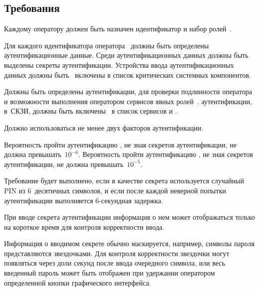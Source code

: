 \subsection{Требования}\label{IA.Reqs}

\label{R.IA.Id}
Каждому оператору должен быть назначен идентификатор и набор 
ролей~.

\label{R.IA.AuthData}
Для каждого идентификатора оператора~
должны быть определены аутентификационные данные. 
Среди аутентификационных данных должны быть выделены 
секреты аутентификации.
%
Устройства ввода аутентификационных данных должны быть~ 
включены в список критических системных компонентов. 

\label{R.IA.Auth}
Должны быть определены  аутентификации, 
 для проверки подлинности оператора и возможности 
выполнения оператором сервисов явных ролей~.
%
 аутентификации,  в~СКЗИ,
должны быть включены~ в список сервисов
и .

\label{R.IA.2FA}
Должно использоваться не менее двух факторов аутентификации.

\label{R.IA.AuthStrength}
Вероятность пройти аутентификацию , 
не зная секретов аутентификации, 
не должна превышать~$10^{-6}$.
%
Вероятность пройти аутентификацию , 
не зная секретов аутентификации, 
не должна превышать~$10^{-5}$.

\begin{note}
Требование будет выполнено, если в качестве секрета используется случайный PIN
из $6$~десятичных символов, и если после каждой неверной попытки аутентификации
выполняется $6$-секундная задержка.
\end{note}

\label{R.IA.PwdMask}
При вводе секрета аутентификации информация о нем может отображаться только на 
короткое время для контроля корректности ввода.

\begin{note}
Информация о вводимом секрете обычно маскируется, например, символы пароля
представляются звездочками. Для контроля корректности звездочки могут появляться
через доли секунд после ввода очередного символа, или весь 
введенный пароль может быть отображен при удержании оператором определенной 
кнопки графического интерфейса.
\end{note}

